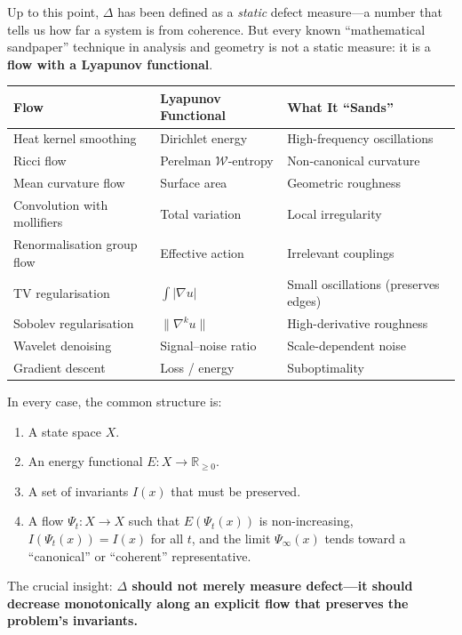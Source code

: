 \documentclass[12pt, openany]{book}
\theoremstyle{remark}
\begin{document}
Up to this point, $\Delta$ has been defined as a \emph{static} defect measure---a number
that tells us how far a system is from coherence.  But every known ``mathematical
sandpaper'' technique in analysis and geometry is not a static measure: it is a
\textbf{flow with a Lyapunov functional}.

\begin{center}
\begin{tabular}{@{}lll@{}}
\toprule
\textbf{Flow} & \textbf{Lyapunov Functional} & \textbf{What It ``Sands''} \\
\midrule
Heat kernel smoothing & Dirichlet energy & High-frequency oscillations \\
Ricci flow & Perelman $\mathcal{W}$-entropy & Non-canonical curvature \\
Mean curvature flow & Surface area & Geometric roughness \\
Convolution with mollifiers & Total variation & Local irregularity \\
Renormalisation group flow & Effective action & Irrelevant couplings \\
TV regularisation & $\int|\nabla u|$ & Small oscillations (preserves edges) \\
Sobolev regularisation & $\|\nabla^k u\|$ & High-derivative roughness \\
Wavelet denoising & Signal--noise ratio & Scale-dependent noise \\
Gradient descent & Loss / energy & Suboptimality \\
\bottomrule
\end{tabular}
\end{center}

\noindent
In every case, the common structure is:
\begin{enumerate}
  \item A state space $X$.
  \item An energy functional $E : X \to \mathbb{R}_{\geq 0}$.
  \item A set of invariants $I(x)$ that must be preserved.
  \item A flow $\Psi_t : X \to X$ such that $E(\Psi_t(x))$ is non-increasing,
        $I(\Psi_t(x)) = I(x)$ for all $t$, and the limit $\Psi_\infty(x)$ tends
        toward a ``canonical'' or ``coherent'' representative.
\end{enumerate}

\noindent
The crucial insight: \textbf{$\Delta$ should not merely measure defect---it should
decrease monotonically along an explicit flow that preserves the problem's invariants.}
\end{document}
